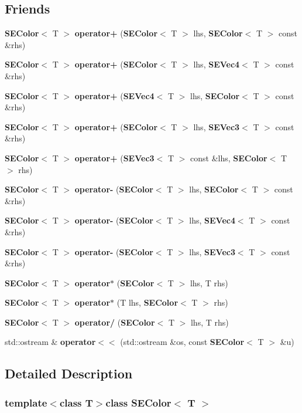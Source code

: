 \subsection*{Friends}
\begin{DoxyCompactItemize}
\item 
{\bf S\+E\+Color}$<$ T $>$ {\bf operator+} ({\bf S\+E\+Color}$<$ T $>$ lhs, {\bf S\+E\+Color}$<$ T $>$ const \&rhs)
\item 
{\bf S\+E\+Color}$<$ T $>$ {\bf operator+} ({\bf S\+E\+Color}$<$ T $>$ lhs, {\bf S\+E\+Vec4}$<$ T $>$ const \&rhs)
\item 
{\bf S\+E\+Color}$<$ T $>$ {\bf operator+} ({\bf S\+E\+Vec4}$<$ T $>$ lhs, {\bf S\+E\+Color}$<$ T $>$ const \&rhs)
\item 
{\bf S\+E\+Color}$<$ T $>$ {\bf operator+} ({\bf S\+E\+Color}$<$ T $>$ lhs, {\bf S\+E\+Vec3}$<$ T $>$ const \&rhs)
\item 
{\bf S\+E\+Color}$<$ T $>$ {\bf operator+} ({\bf S\+E\+Vec3}$<$ T $>$ const \&lhs, {\bf S\+E\+Color}$<$ T $>$ rhs)
\item 
{\bf S\+E\+Color}$<$ T $>$ {\bf operator-\/} ({\bf S\+E\+Color}$<$ T $>$ lhs, {\bf S\+E\+Color}$<$ T $>$ const \&rhs)
\item 
{\bf S\+E\+Color}$<$ T $>$ {\bf operator-\/} ({\bf S\+E\+Color}$<$ T $>$ lhs, {\bf S\+E\+Vec4}$<$ T $>$ const \&rhs)
\item 
{\bf S\+E\+Color}$<$ T $>$ {\bf operator-\/} ({\bf S\+E\+Color}$<$ T $>$ lhs, {\bf S\+E\+Vec3}$<$ T $>$ const \&rhs)
\item 
{\bf S\+E\+Color}$<$ T $>$ {\bf operator$\ast$} ({\bf S\+E\+Color}$<$ T $>$ lhs, T rhs)
\item 
{\bf S\+E\+Color}$<$ T $>$ {\bf operator$\ast$} (T lhs, {\bf S\+E\+Color}$<$ T $>$ rhs)
\item 
{\bf S\+E\+Color}$<$ T $>$ {\bf operator/} ({\bf S\+E\+Color}$<$ T $>$ lhs, T rhs)
\item 
std\+::ostream \& {\bf operator$<$$<$} (std\+::ostream \&os, const {\bf S\+E\+Color}$<$ T $>$ \&u)
\end{DoxyCompactItemize}


\subsection{Detailed Description}
\subsubsection*{template$<$class T$>$class S\+E\+Color$<$ T $>$}



